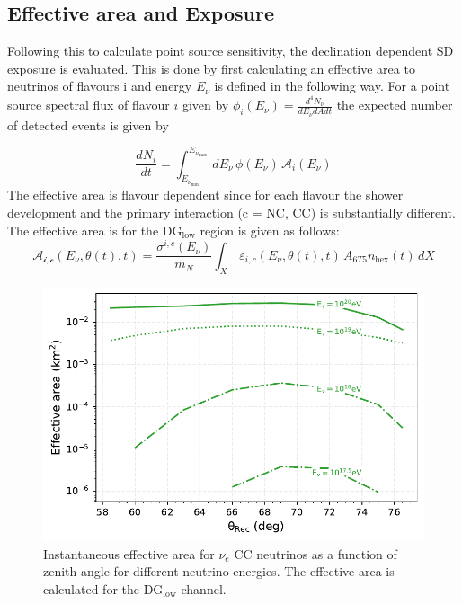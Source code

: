 \subsection{Effective area and Exposure}
\label{subsec:psource_area}
Following this to calculate point source sensitivity, the declination dependent SD exposure is evaluated. This is done by first calculating an effective area to neutrinos of flavours i and energy $E_{\nu}$ is defined in the following way. For a point source spectral flux of flavour $i$ given by $\phi_i(E_{\nu}) = \frac{d^4 N_{\nu}}{dE_{\nu} dA dt}$ the expected number of detected events is given by 

\begin{equation}
  \label{eq:expected_events_point}
  \frac{dN_{i}}{dt} = \int_{E_{\nu_{\text{min}}}}^{E_{\nu_{\text{max}}}} \, dE_{\nu} \, \phi(E_{\nu}) \, \mathcal{A}_i(E_{\nu})
\end{equation}
The effective area is flavour dependent since for each flavour the shower development and the primary interaction (c = NC, CC) is substantially different. The effective area is for the DG$\mathrm{_{\text{low}}}$ region is given as follows:
\begin{equation}
  \label{eq:effective_area}
  \mathcal{A_{i,c}}(E_{\nu},\theta(t),t) = \frac{\sigma^{i,c}(E_{\nu})}{m_N} \int_{X} \, \varepsilon_{i,c}(E_{\nu},\theta(t),t) \, A_{6T5} n_{\text{hex}}(t) \, dX
\end{equation}

\begin{figure}[t!]
  \centering
  \includegraphics[width=14.5cm]{thesis_figures/PointLimits/EffArea_vs_Theta_CC_optim.pdf}
  \caption{Instantaneous effective area for $\nu_e$ CC neutrinos as a function of zenith angle for different neutrino energies. The effective area is calculated for the DG$\mathrm{_{\text{low}}}$ channel.}
  \label{fig:Eff_Area}
\end{figure}


